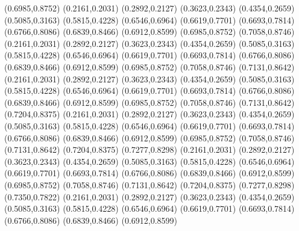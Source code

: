 \PST@Diamond(0.6985,0.8752)
\PST@Diamond(0.2161,0.2031)
\PST@Diamond(0.2892,0.2127)
\PST@Diamond(0.3623,0.2343)
\PST@Diamond(0.4354,0.2659)
\PST@Diamond(0.5085,0.3163)
\PST@Diamond(0.5815,0.4228)
\PST@Diamond(0.6546,0.6964)
\PST@Diamond(0.6619,0.7701)
\PST@Diamond(0.6693,0.7814)
\PST@Diamond(0.6766,0.8086)
\PST@Diamond(0.6839,0.8466)
\PST@Diamond(0.6912,0.8599)
\PST@Diamond(0.6985,0.8752)
\PST@Diamond(0.7058,0.8746)
\PST@Diamond(0.2161,0.2031)
\PST@Diamond(0.2892,0.2127)
\PST@Diamond(0.3623,0.2343)
\PST@Diamond(0.4354,0.2659)
\PST@Diamond(0.5085,0.3163)
\PST@Diamond(0.5815,0.4228)
\PST@Diamond(0.6546,0.6964)
\PST@Diamond(0.6619,0.7701)
\PST@Diamond(0.6693,0.7814)
\PST@Diamond(0.6766,0.8086)
\PST@Diamond(0.6839,0.8466)
\PST@Diamond(0.6912,0.8599)
\PST@Diamond(0.6985,0.8752)
\PST@Diamond(0.7058,0.8746)
\PST@Diamond(0.7131,0.8642)
\PST@Diamond(0.2161,0.2031)
\PST@Diamond(0.2892,0.2127)
\PST@Diamond(0.3623,0.2343)
\PST@Diamond(0.4354,0.2659)
\PST@Diamond(0.5085,0.3163)
\PST@Diamond(0.5815,0.4228)
\PST@Diamond(0.6546,0.6964)
\PST@Diamond(0.6619,0.7701)
\PST@Diamond(0.6693,0.7814)
\PST@Diamond(0.6766,0.8086)
\PST@Diamond(0.6839,0.8466)
\PST@Diamond(0.6912,0.8599)
\PST@Diamond(0.6985,0.8752)
\PST@Diamond(0.7058,0.8746)
\PST@Diamond(0.7131,0.8642)
\PST@Diamond(0.7204,0.8375)
\PST@Diamond(0.2161,0.2031)
\PST@Diamond(0.2892,0.2127)
\PST@Diamond(0.3623,0.2343)
\PST@Diamond(0.4354,0.2659)
\PST@Diamond(0.5085,0.3163)
\PST@Diamond(0.5815,0.4228)
\PST@Diamond(0.6546,0.6964)
\PST@Diamond(0.6619,0.7701)
\PST@Diamond(0.6693,0.7814)
\PST@Diamond(0.6766,0.8086)
\PST@Diamond(0.6839,0.8466)
\PST@Diamond(0.6912,0.8599)
\PST@Diamond(0.6985,0.8752)
\PST@Diamond(0.7058,0.8746)
\PST@Diamond(0.7131,0.8642)
\PST@Diamond(0.7204,0.8375)
\PST@Diamond(0.7277,0.8298)
\PST@Diamond(0.2161,0.2031)
\PST@Diamond(0.2892,0.2127)
\PST@Diamond(0.3623,0.2343)
\PST@Diamond(0.4354,0.2659)
\PST@Diamond(0.5085,0.3163)
\PST@Diamond(0.5815,0.4228)
\PST@Diamond(0.6546,0.6964)
\PST@Diamond(0.6619,0.7701)
\PST@Diamond(0.6693,0.7814)
\PST@Diamond(0.6766,0.8086)
\PST@Diamond(0.6839,0.8466)
\PST@Diamond(0.6912,0.8599)
\PST@Diamond(0.6985,0.8752)
\PST@Diamond(0.7058,0.8746)
\PST@Diamond(0.7131,0.8642)
\PST@Diamond(0.7204,0.8375)
\PST@Diamond(0.7277,0.8298)
\PST@Diamond(0.7350,0.7822)
\PST@Diamond(0.2161,0.2031)
\PST@Diamond(0.2892,0.2127)
\PST@Diamond(0.3623,0.2343)
\PST@Diamond(0.4354,0.2659)
\PST@Diamond(0.5085,0.3163)
\PST@Diamond(0.5815,0.4228)
\PST@Diamond(0.6546,0.6964)
\PST@Diamond(0.6619,0.7701)
\PST@Diamond(0.6693,0.7814)
\PST@Diamond(0.6766,0.8086)
\PST@Diamond(0.6839,0.8466)
\PST@Diamond(0.6912,0.8599)
